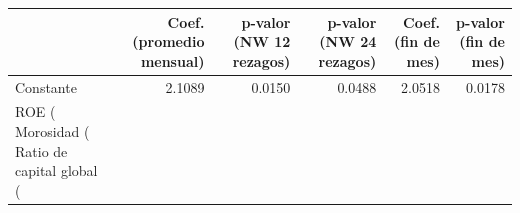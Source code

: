 \begin{tabular}{lrrrrr}
\toprule
 & Coef. (promedio mensual) & p-valor (NW 12 rezagos) & p-valor (NW 24 rezagos) & Coef. (fin de mes) & p-valor (fin de mes) \\
\midrule
Constante & 2.1089 & 0.0150 & 0.0488 & 2.0518 & 0.0178 \\
ROE (%
Morosidad (%
Ratio de capital global (%
\bottomrule
\end{tabular}
